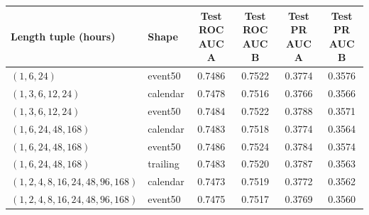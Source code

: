 \begin{tabular}{llcccc}
\toprule
Length tuple (hours) & Shape & Test ROC AUC A & Test ROC AUC B & Test PR AUC A & Test PR AUC B \\
\midrule
$(1, 6, 24)$ & event50 & 0.7486 & 0.7522 & 0.3774 & 0.3576 \\
$(1, 3, 6, 12, 24)$ & calendar & 0.7478 & 0.7516 & 0.3766 & 0.3566 \\
$(1, 3, 6, 12, 24)$ & event50 & 0.7484 & 0.7522 & 0.3788 & 0.3571 \\
$(1, 6, 24, 48, 168)$ & calendar & 0.7483 & 0.7518 & 0.3774 & 0.3564 \\
$(1, 6, 24, 48, 168)$ & event50 & 0.7486 & 0.7524 & 0.3784 & 0.3574 \\
$(1, 6, 24, 48, 168)$ & trailing & 0.7483 & 0.7520 & 0.3787 & 0.3563 \\
$(1, 2, 4, 8, 16, 24, 48, 96, 168)$ & calendar & 0.7473 & 0.7519 & 0.3772 & 0.3562 \\
$(1, 2, 4, 8, 16, 24, 48, 96, 168)$ & event50 & 0.7475 & 0.7517 & 0.3769 & 0.3560 \\
\bottomrule
\end{tabular}
